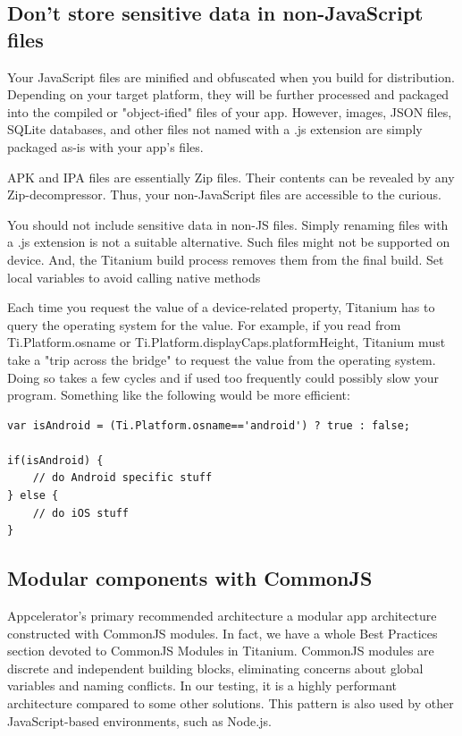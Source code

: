 \documentclass[11pt]{book}
\begin{document}
\subsection{Don't store sensitive data in non-JavaScript files}
Your JavaScript files are minified and obfuscated when you build for distribution. Depending on your target platform, they will be further processed and packaged into the compiled or "object-ified" files of your app. However, images, JSON files, SQLite databases, and other files not named with a .js extension are simply packaged as-is with your app's files.

APK and IPA files are essentially Zip files. Their contents can be revealed by any Zip-decompressor. Thus, your non-JavaScript files are accessible to the curious.

You should not include sensitive data in non-JS files. Simply renaming files with a .js extension is not a suitable alternative. Such files might not be supported on device. And, the Titanium build process removes them from the final build.
Set local variables to avoid calling native methods

Each time you request the value of a device-related property, Titanium has to query the operating system for the value. For example, if you read from Ti.Platform.osname or Ti.Platform.displayCaps.platformHeight, Titanium must take a "trip across the bridge" to request the value from the operating system. Doing so takes a few cycles and if used too frequently could possibly slow your program. Something like the following would be more efficient:

\begin{lstlisting}[frame=single]
var isAndroid = (Ti.Platform.osname=='android') ? true : false;

if(isAndroid) {
	// do Android specific stuff
} else {
	// do iOS stuff
}
\end{lstlisting}

\subsection{Modular components with CommonJS}
Appcelerator's primary recommended architecture a modular app architecture constructed with CommonJS modules. In fact, we have a whole Best Practices section devoted to CommonJS Modules in Titanium. CommonJS modules are discrete and independent building blocks, eliminating concerns about global variables and naming conflicts. In our testing, it is a highly performant architecture compared to some other solutions. This pattern is also used by other JavaScript-based environments, such as Node.js.
\end{document}
